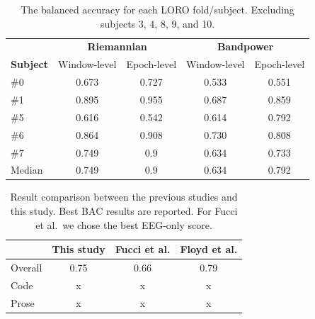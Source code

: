         \begin{table}[h]
            \centering
            \begin{tabular}{lcccc}
                \toprule
                & \multicolumn{2}{c}{\textbf{Riemannian}} & \multicolumn{2}{c}{\textbf{Bandpower}} \\
                \cmidrule(lr){2-3}
                \cmidrule(lr){4-5}
                \textbf{Subject} & Window-level & Epoch-level & Window-level & Epoch-level \\
                \midrule
                \#0 & 0.673 & 0.727 & 0.533 & 0.551 \\
                \#1 & 0.895 & 0.955 & 0.687 & 0.859 \\
                \#5 & 0.616 & 0.542 & 0.614 & 0.792 \\
                \#6 & 0.864 & 0.908 & 0.730 & 0.808 \\
                \#7 & 0.749 & 0.9   & 0.634 & 0.733 \\
                \midrule
                Median & 0.749 & 0.9 & 0.634 & 0.792 \\
                \bottomrule
            \end{tabular}
            \caption{The balanced accuracy for each LORO fold/subject. Excluding subjects 3, 4, 8, 9, and 10.}\label{table:bac-selective}
        \end{table}

        \begin{table}
            \begin{center}
                \begin{tabular}{lccc}
                    \toprule
                    & \textbf{This study} & \textbf{Fucci et al.} & \textbf{Floyd et al.} \\
                    \midrule
                    Overall & 0.75 & 0.66 & 0.79 \\
                    Code & x & x & x \\
                    Prose & x & x & x \\
                    \bottomrule
                \end{tabular}
                \caption{Result comparison between the previous studies and this study. Best BAC results are reported. For Fucci et al.\ we chose the best EEG-only score.}\label{table:compare-results}
            \end{center}
        \end{table}

